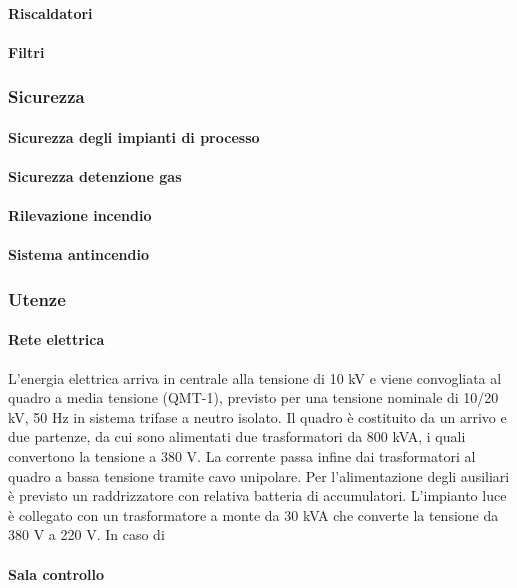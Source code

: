 \paragraph{Riscaldatori}
\paragraph{Filtri}

\subsubsection{Sicurezza}
\paragraph{Sicurezza degli impianti di processo}
\paragraph{Sicurezza detenzione gas}
\paragraph{Rilevazione incendio}
\paragraph{Sistema antincendio}

\subsubsection{Utenze}
\paragraph{Rete elettrica}
L'energia elettrica arriva in centrale alla tensione di 10 kV e viene convogliata al quadro a media tensione (QMT-1), previsto per una tensione nominale di 10/20 kV, 50 Hz in sistema trifase a neutro isolato. Il quadro è costituito da un arrivo e due partenze, da cui sono alimentati due trasformatori da 800 kVA, i quali convertono la tensione a 380 V. La corrente passa infine dai trasformatori al quadro a bassa tensione tramite cavo unipolare. Per l'alimentazione degli ausiliari è previsto un raddrizzatore con relativa batteria di accumulatori. L'impianto luce è collegato con un trasformatore a monte da 30 kVA che converte la tensione da 380 V a 220 V. In caso di
\paragraph{Sala controllo}

